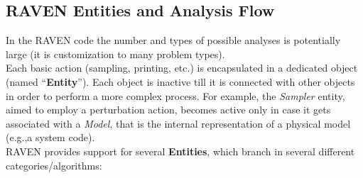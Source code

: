 \subsection{RAVEN Entities and Analysis Flow}
\label{sub:EntitiesAndFlow}
In the RAVEN code the number and types of possible analyses is potentially large (it is customization to many problem types).
\\Each basic action (sampling, printing, etc.) is encapsulated in
a dedicated object (named ``\textbf{Entity}''). Each object is inactive till it is connected with 
other objects in order to perform a more complex process. For example,
the \textit{Sampler} entity, aimed to employ a perturbation action, becomes active only in case
it gets associated with a \textit{Model}, that is the internal representation of a physical model (e.g.,a system code).
\\RAVEN provides support for several \textbf{Entities}, which branch in several different categories/algorithms:
